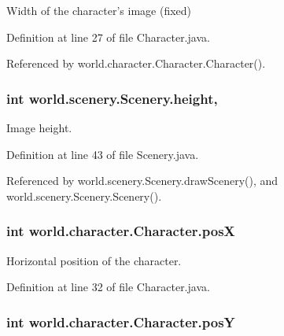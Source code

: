 Width of the character's image (fixed) 



Definition at line 27 of file Character.\-java.



Referenced by world.\-character.\-Character.\-Character().

\hypertarget{classworld_1_1scenery_1_1_scenery_a54b4edfa060087e78a829105bf62a900}{
\subsubsection[{height}]{\setlength{\rightskip}{0pt plus 5cm}int world.\-scenery.\-Scenery.\-height\hspace{0.3cm}{\ttfamily [protected]}, {\ttfamily [inherited]}}}\label{classworld_1_1scenery_1_1_scenery_a54b4edfa060087e78a829105bf62a900}


Image height. 



Definition at line 43 of file Scenery.\-java.



Referenced by world.\-scenery.\-Scenery.\-draw\-Scenery(), and world.\-scenery.\-Scenery.\-Scenery().

\hypertarget{classworld_1_1character_1_1_character_a78ad3a5c111a39df2ba12b542fa175b4}{
\subsubsection[{pos\-X}]{\setlength{\rightskip}{0pt plus 5cm}int world.\-character.\-Character.\-pos\-X\hspace{0.3cm}{\ttfamily [protected]}}}\label{classworld_1_1character_1_1_character_a78ad3a5c111a39df2ba12b542fa175b4}


Horizontal position of the character. 



Definition at line 32 of file Character.\-java.

\hypertarget{classworld_1_1character_1_1_character_a1e81a73a02b73e6f1608ba3c1b6d83ef}{
\subsubsection[{pos\-Y}]{\setlength{\rightskip}{0pt plus 5cm}int world.\-character.\-Character.\-pos\-Y\hspace{0.3cm}{\ttfamily [protected]}}}\label{classworld_1_1character_1_1_character_a1e81a73a02b73e6f1608ba3c1b6d83ef}


